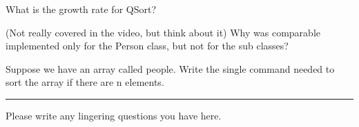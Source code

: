 \documentclass[letterpaper,12pt]{exam}
\begin{document}
\begin{questions}
\begin{samepage}
    \question What is the growth rate for QSort?
    \vspace{5mm}
\end{samepage}

\begin{samepage}
    \question (Not really covered in the video, but think about it) Why was comparable implemented only for the Person class, but not for the sub classes?
    \vspace{5mm}
\end{samepage}

\begin{samepage}
    \question Suppose we have an array called people.  Write the single command needed to sort the array if there are n elements.
    \vspace{5mm}
\end{samepage}


\begin{center}
    \rule{0.5\textwidth}{.4pt}
\end{center}
Please write any lingering questions you have here.
\end{questions}
\end{document}
